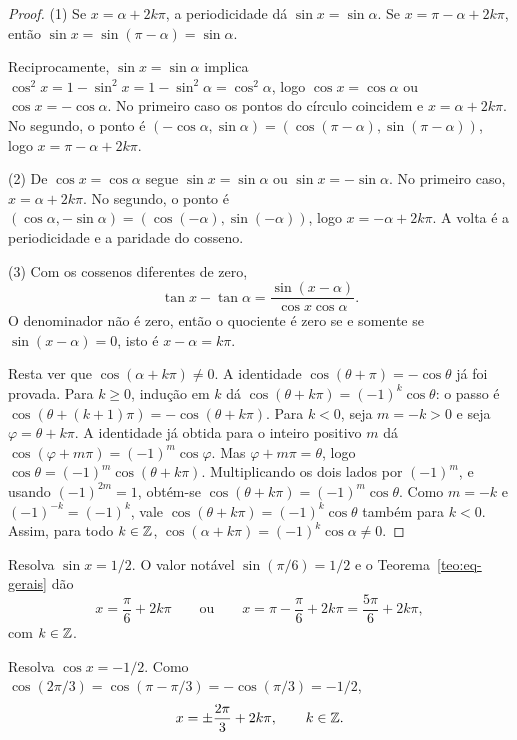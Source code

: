 \documentclass[11pt,a4paper]{article}
\begin{document}
\begin{proof}
(1) Se $x=\alpha+2k\pi$, a periodicidade dá $\sin x=\sin\alpha$. Se $x=\pi-\alpha+2k\pi$, então $\sin x=\sin(\pi-\alpha)=\sin\alpha$.

Reciprocamente, $\sin x=\sin\alpha$ implica $\cos^2 x=1-\sin^2 x=1-\sin^2\alpha=\cos^2\alpha$, logo $\cos x=\cos\alpha$ ou $\cos x=-\cos\alpha$. No primeiro caso os pontos do círculo coincidem e $x=\alpha+2k\pi$. No segundo, o ponto é $(-\cos\alpha,\sin\alpha)=(\cos(\pi-\alpha),\sin(\pi-\alpha))$, logo $x=\pi-\alpha+2k\pi$.

(2) De $\cos x=\cos\alpha$ segue $\sin x=\sin\alpha$ ou $\sin x=-\sin\alpha$. No primeiro caso, $x=\alpha+2k\pi$. No segundo, o ponto é $(\cos\alpha,-\sin\alpha)=(\cos(-\alpha),\sin(-\alpha))$, logo $x=-\alpha+2k\pi$. A volta é a periodicidade e a paridade do cosseno.

(3) Com os cossenos diferentes de zero,
\[
\tan x-\tan\alpha
=\frac{\sin(x-\alpha)}{\cos x\cos\alpha}.
\]
O denominador não é zero, então o quociente é zero se e somente se $\sin(x-\alpha)=0$, isto é $x-\alpha=k\pi$.

Resta ver que $\cos(\alpha+k\pi)\neq 0$. A identidade $\cos(\theta+\pi)=-\cos\theta$ já foi provada. Para $k\ge 0$, indução em $k$ dá $\cos(\theta+k\pi)=(-1)^k\cos\theta$: o passo é $\cos(\theta+(k+1)\pi)=-\cos(\theta+k\pi)$. Para $k<0$, seja $m=-k>0$ e seja $\varphi=\theta+k\pi$. A identidade já obtida para o inteiro positivo $m$ dá $\cos(\varphi+m\pi)=(-1)^m\cos\varphi$. Mas $\varphi+m\pi=\theta$, logo $\cos\theta=(-1)^m\cos(\theta+k\pi)$. Multiplicando os dois lados por $(-1)^m$, e usando $(-1)^{2m}=1$, obtém-se $\cos(\theta+k\pi)=(-1)^m\cos\theta$. Como $m=-k$ e $(-1)^{-k}=(-1)^k$, vale $\cos(\theta+k\pi)=(-1)^k\cos\theta$ também para $k<0$. Assim, para todo $k\in\mathbb{Z}$, $\cos(\alpha+k\pi)=(-1)^k\cos\alpha\neq 0$.
\end{proof}

\begin{exemplo}
Resolva $\sin x=1/2$. O valor notável $\sin(\pi/6)=1/2$ e o Teorema~\ref{teo:eq-gerais} dão
\[
x=\frac{\pi}{6}+2k\pi\qquad\text{ou}\qquad x=\pi-\frac{\pi}{6}+2k\pi=\frac{5\pi}{6}+2k\pi,
\]
com $k\in\mathbb{Z}$.
\end{exemplo}

\begin{exemplo}
Resolva $\cos x=-1/2$. Como $\cos(2\pi/3)=\cos(\pi-\pi/3)=-\cos(\pi/3)=-1/2$,
\[
x=\pm\frac{2\pi}{3}+2k\pi,\qquad k\in\mathbb{Z}.
\]
\end{exemplo}
\end{document}
